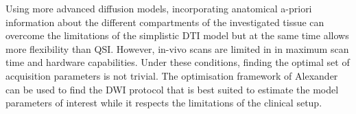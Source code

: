 Using more advanced diffusion models, incorporating anatomical a-priori information about the different compartments of the investigated tissue can overcome the limitations of the simplistic DTI model but at the same time allows more flexibility than QSI. However, in-vivo scans are limited in in maximum scan time and hardware capabilities. Under these conditions, finding the optimal set of acquisition parameters is not trivial. The  optimisation framework of Alexander can be used to find the DWI protocol that is best suited to estimate the model parameters of interest while it respects the limitations of the clinical setup.  
